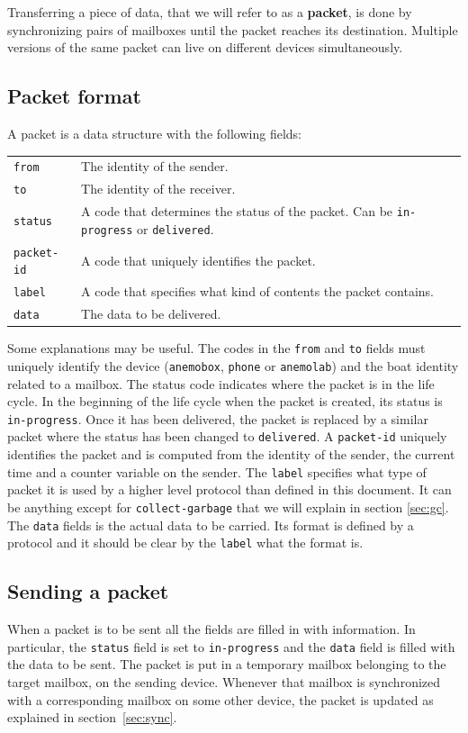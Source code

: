 \documentclass{article}
\newcommand{\device}[1]{\texttt{#1}}
\newcommand{\anemobox}{\device{anemobox}}
\newcommand{\phone}{\device{phone}}
\newcommand{\anemolab}{\texttt{anemolab}}
\begin{document}
Transferring a piece of data, that we will refer to as a \textbf{packet}, is done by synchronizing pairs of mailboxes until the packet reaches its destination. Multiple versions of the same packet can live on different devices simultaneously.

\subsection{Packet format}
A packet is a data structure with the following fields:

\begin{tabular}{l p{30em}}
  \texttt{from} & The identity of the sender. \\
  \texttt{to} & The identity of the receiver. \\
  \texttt{status} & A code that determines the status of the packet. Can be \texttt{in-progress} or \texttt{delivered}. \\
  \texttt{packet-id} & A code that uniquely identifies the packet. \\
  \texttt{label} & A code that specifies what kind of contents the packet contains.\\
  \texttt{data} & The data to be delivered.
\end{tabular}

Some explanations may be useful. The codes in the \texttt{from} and \texttt{to} fields must uniquely identify the device (\anemobox{}, \phone{} or \anemolab{}) and the boat identity related to a mailbox. The status code indicates where the packet is in the life cycle. In the beginning of the life cycle when the packet is created, its status is \texttt{in-progress}. Once it has been delivered, the packet is replaced by a similar packet where the status has been changed to \texttt{delivered}. A \texttt{packet-id} uniquely identifies the packet and is computed from the identity of the sender, the current time and a counter variable on the sender. The \texttt{label} specifies what type of packet it is used by a higher level protocol than defined in this document. It can be anything except for \texttt{collect-garbage} that we will explain in section \ref{sec:gc}. The \texttt{data} fields is the actual data to be carried. Its format is defined by a protocol and it should be clear by the \texttt{label} what the format is.

\subsection{Sending a packet}
When a packet is to be sent all the fields are filled in with information. In particular, the \texttt{status} field is set to \texttt{in-progress} and the \texttt{data} field is filled with the data to be sent. The packet is put in a temporary mailbox belonging to the target mailbox, on the sending device. Whenever that mailbox is synchronized with a corresponding mailbox on some other device, the packet is updated as explained in section~\ref{sec:sync}.
\end{document}
